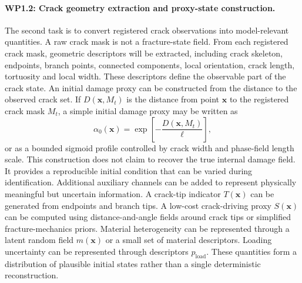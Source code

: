\paragraph{WP1.2: Crack geometry extraction and proxy-state construction.}
The second task is to convert registered crack observations into model-relevant quantities.
A raw crack mask is not a fracture-state field. From each registered crack mask, geometric descriptors will be extracted, including crack skeleton, endpoints, branch points, connected components, local orientation, crack length, tortuosity and local width.
These descriptors define the observable part of the crack state.
An initial damage proxy can be constructed from the distance to the observed crack set.
If $D(\mathbf{x},M_t)$ is the distance from point $\mathbf{x}$ to the registered crack mask $M_t$, a simple initial damage proxy may be written as
\[
    \alpha_0(\mathbf{x}) = \exp\left[-\frac{D(\mathbf{x},M_t)}{\ell}\right],
\]
or as a bounded sigmoid profile controlled by crack width and phase-field length scale.
This construction does not claim to recover the true internal damage field.
It provides a reproducible initial condition that can be varied during identification.
Additional auxiliary channels can be added to represent physically meaningful but uncertain information.
A crack-tip indicator $T(\mathbf{x})$ can be generated from endpoints and branch tips.
A low-cost crack-driving proxy $S(\mathbf{x})$ can be computed using distance-and-angle fields around crack tips or simplified fracture-mechanics priors.
Material heterogeneity can be represented through a latent random field $m(\mathbf{x})$ or a small set of material descriptors.
Loading uncertainty can be represented through descriptors $p_{\mathrm{load}}$. These quantities form a distribution of plausible initial states rather than a single deterministic reconstruction.

